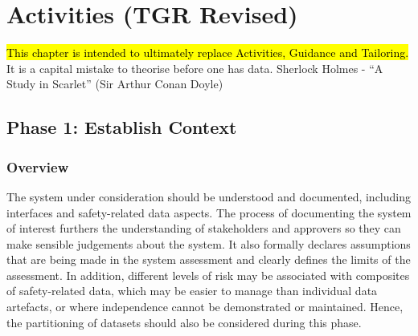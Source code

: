 %
%
\chapter{Activities (TGR Revised)}\label{bkm:activities}
\hl{This chapter is intended to ultimately replace Activities, Guidance and Tailoring. }
\dsiwgSectionQuote
  {It is a capital mistake to theorise before one has data.}
  {Sherlock Holmes - ``A Study in Scarlet'' (Sir Arthur Conan Doyle)}


\section{Phase 1: Establish Context}\label{bkm:establishcontext}
\subsection{Overview}
The system under consideration should be understood and documented, including interfaces and safety-related data aspects. The process of documenting the system of interest furthers the understanding of \glspl{stakeholder} and approvers so they can make sensible judgements about the system. It also formally declares assumptions that are being made in the system assessment and clearly defines the limits of the assessment. In addition, different levels of risk may be associated with composites of safety-related data, which may be easier to manage than individual \glspl{data artefact}, or where independence cannot be demonstrated or maintained. Hence, the partitioning of \glspl{dataset} should also be considered during this phase.

